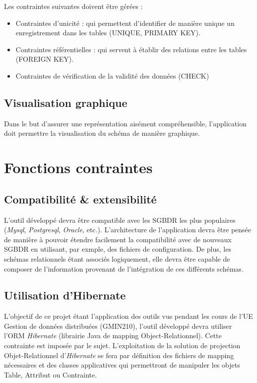 				Les contraintes suivantes doivent être gérées : 
				
				\begin{itemize}
				\item Contraintes d'unicité : qui permettent d'identifier de manière unique un enregistrement dans les tables (UNIQUE, PRIMARY KEY).
				\item Contraintes référentielles : qui servent à établir des relations entre les tables (FOREIGN KEY).
				\item Contraintes de vérification de la validité des données (CHECK)
				\end{itemize}
				
		\subsection{Visualisation graphique}
		Dans le but d'assurer une représentation aisément compréhensible, l'application doit permettre la visualisation du schéma de manière graphique.

\section{Fonctions contraintes}
	\subsection{Compatibilité \& extensibilité}
	L'outil développé devra être compatible avec les SGBDR les plus populaires (\emph{Mysql}, \emph{Postgresql}, \emph{Oracle}, etc.). L'architecture de l'application devra être pensée de manière à pouvoir étendre facilement la compatibilité avec de nouveaux SGBDR en utilisant, par exmple, des fichiers de configuration. De plus, les schémas relationnels étant associés logiquement, elle devra être capable de composer de l’information provenant de l’intégration de ces différents schémas.
	\subsection{Utilisation d'Hibernate}
	L'objectif de ce projet étant l'application des outils vus pendant les cours de l'UE Gestion de données distribuées (GMIN210), l'outil développé devra utiliser l'ORM \emph{Hibernate} (librairie Java de mapping Object-Relationnel). Cette contrainte est imposée par le sujet. L'exploitation de la solution de projection Objet-Relationnel d'\emph{Hibernate} se fera par définition des fichiers de mapping nécessaires et des classes applicatives qui permettront de manipuler les objets Table, Attribut ou Contrainte.
